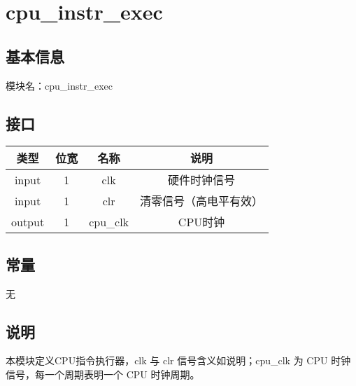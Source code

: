 \section{cpu\_instr\_exec}
\subsection{基本信息}
模块名：cpu\_instr\_exec
\subsection{接口}
\begin{tabular}{|c|c|c|c|}
    \hline
    类型    & 位宽 &   名称    &   说明\\\hline
    input   &  1  &   clk     &   硬件时钟信号\\\hline
    input   &  1  &   clr     &   清零信号（高电平有效）\\\hline
    output  &  1  &   cpu\_clk &   CPU时钟\\\hline
\end{tabular}
\subsection{常量}
    无
\subsection{说明}
本模块定义CPU指令执行器，clk 与 clr 信号含义如说明；cpu\_clk 为 CPU 时钟信号，每一个周期表明一个 CPU 时钟周期。